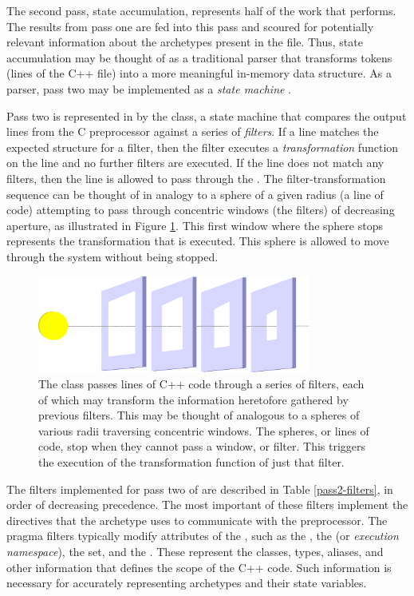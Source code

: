 The second pass, state accumulation, represents half of the work that \cycpp performs.
The results from pass one are fed into this pass and scoured for 
potentially relevant information about the archetypes present in the file. 
Thus, state accumulation 
may be thought of as a traditional parser that transforms tokens (lines of the 
C++ file) into a more meaningful in-memory data structure. As a parser, pass two 
may be implemented as a \emph{state machine}
\cite{mertz2003text,wagner2006modeling}.

Pass two is represented in \cycpp by the  class,  a
state machine that compares the output lines from the C preprocessor against a series of \emph{filters}.  If a line matches the expected structure 
for a filter, then the filter executes a \emph{transformation} function on the 
line and no further filters are executed. If the line does not match any 
filters, then the line is allowed to pass through the .  
The filter-transformation sequence can be thought of in analogy to a sphere of 
a given radius (a line of code) attempting to pass through concentric windows 
(the filters) of decreasing aperture, as illustrated in Figure \ref{filter-analogy}. 
This first window where the sphere stops 
represents the transformation that is executed.  This sphere is allowed to move 
through the system without being stopped.

\begin{figure}[htbc]
\centering
\includegraphics[width=0.8\textwidth]{filter-analogy.eps}
\caption{The  class passes lines of C++ code through 
a series of filters, each of which may transform the information heretofore gathered
by previous filters. 
This may be thought of analogous to a spheres of various radii traversing 
concentric windows.  The spheres, or lines of code, stop when they cannot pass a  
window, or filter. This triggers the execution of the transformation function of just 
that filter.}
\label{filter-analogy}
\end{figure}

The filters implemented for pass two of \cycpp are described in Table \ref{pass2-filters}, 
in order of decreasing precedence. The most important of these filters implement 
the  directives that the archetype uses to communicate
with the preprocessor.  The pragma filters typically modify attributes of
the , such as the , the  
(or \emph{execution namespace}), the  set, and the . 
These represent the classes, types, aliases, and other information that defines
the scope of the C++ code. Such information is necessary 
for accurately representing archetypes and their state variables. 

